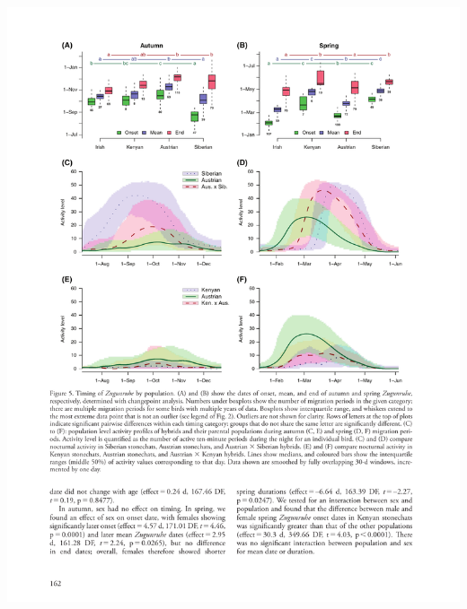 \documentclass[a4paper, twoside]{templates/ociamthesis}
\begin{document}
\begin{center}\includegraphics[width=1\linewidth]{pdf_chapters/zug/zug_crop_Part08} \end{center}
\end{document}
